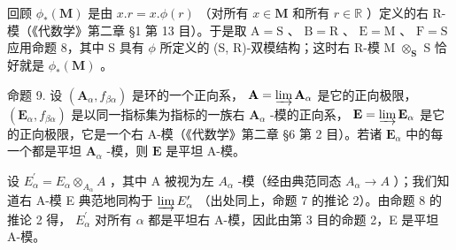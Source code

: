 回顾 \(\phi_{*}(\mathbf{M})\) 是由 \(x.r = x.\phi (r)\) （对所有 \(x\in \mathbf{M}\) 和所有 \(r\in \mathbb{R}\) ）定义的右 R-模（《代数学》第二章 §1 第 13 目）。于是取 \(\mathrm{A} = \mathrm{S}\) 、 \(\mathrm{B} = \mathrm{R}\) 、 \(\mathrm{E} = \mathrm{M}\) 、 \(\mathrm{F} = \mathrm{S}\) 应用命题 8，其中 S 具有 \(\phi\) 所定义的 (S, R)-双模结构；这时右 R-模 M \(\otimes_{\mathbf{S}}\) S 恰好就是 \(\phi_{*}(\mathbf{M})\) 。

命题 9. 设 \((\mathbf{A}_{\alpha}, f_{\beta \alpha})\) 是环的一个正向系， \(\mathbf{A} = \varinjlim \mathbf{A}_{\alpha}\) 是它的正向极限， \((\mathbf{E}_{\alpha}, f_{\beta \alpha})\) 是以同一指标集为指标的一族右 \(\mathbf{A}_{\alpha}\) -模的正向系， \(\mathbf{E} = \varinjlim \mathbf{E}_{\alpha}\) 是它的正向极限，它是一个右 A-模（《代数学》第二章 §6 第 2 目）。若诸 \(\mathbf{E}_{\alpha}\) 中的每一个都是平坦 \(\mathbf{A}_{\alpha}\) -模，则 \(\mathbf{E}\) 是平坦 A-模。

设 \(E_{\alpha}^{\prime}=E_{\alpha}\otimes_{A_{\alpha}}A\) ，其中 A 被视为左 \(A_{\alpha}\) -模（经由典范同态 \(A_{\alpha}\to A\) ）；我们知道右 A-模 E 典范地同构于 \(\varinjlim E_{\alpha}^{\prime}\) （出处同上，命题 7 的推论 2）。由命题 8 的推论 2 得， \(E_{\alpha}^{\prime}\) 对所有 \(\alpha\) 都是平坦右 A-模，因此由第 3 目的命题 2，E 是平坦 A-模。

